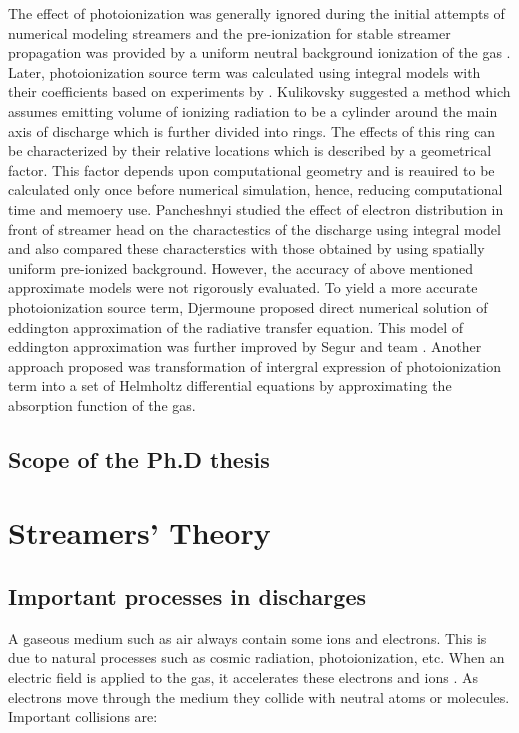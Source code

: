 The effect of photoionization was generally ignored during the initial attempts of numerical modeling streamers and the pre-ionization for stable streamer propagation was provided by a uniform neutral background ionization of the gas \cite{Dhalli et al , 1987}. Later, photoionization source term was calculated using integral models with their coefficients based on experiments by \cite{Penney et al 1970; Zheleznyak et al, 1982}. Kulikovsky suggested a method which assumes emitting volume of ionizing radiation to be a cylinder around the main axis of discharge which is further divided into rings. The effects of this ring can be characterized by their relative locations which is described by a geometrical factor. This factor depends upon computational geometry and is reauired to be calculated only once before numerical simulation, hence, reducing computational time and memoery use. Pancheshnyi \cite{Pancheshnyi et al, 2001} studied the effect of electron distribution in front of streamer head on the charactestics of the discharge using integral model and also compared these characterstics with those obtained by using spatially uniform pre-ionized background. However, the accuracy of above mentioned approximate models were not rigorously evaluated. To yield a more accurate photoionization source term, Djermoune \cite{Djermoune et al., 1995a, 1995b} proposed direct numerical solution of eddington approximation of the radiative transfer equation. This model of eddington approximation was further improved by Segur and team \cite{Segur et al., 2006}. Another approach proposed was transformation of intergral expression of photoionization term into a set of Helmholtz differential equations by approximating the absorption function of the gas. 

\section{Scope of the Ph.D thesis}




\chapter{Streamers' Theory}

\section{Important processes in discharges}
A gaseous medium such as air always contain some ions and electrons. This is due to natural processes such as cosmic radiation, photoionization, etc. When an electric field is applied to the gas, it accelerates these electrons and ions . As electrons move through the medium they collide with neutral atoms or molecules. Important collisions are:


